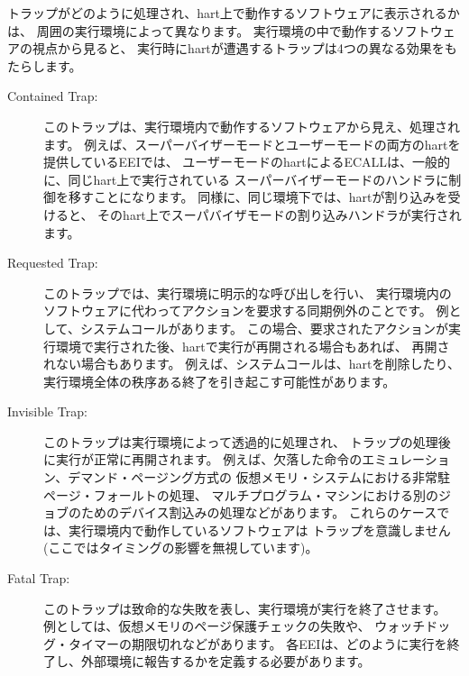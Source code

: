 トラップがどのように処理され、hart上で動作するソフトウェアに表示されるかは、
周囲の実行環境によって異なります。
実行環境の中で動作するソフトウェアの視点から見ると、
実行時にhartが遭遇するトラップは4つの異なる効果をもたらします。

\begin{description}
  \item [Contained Trap:] このトラップは、実行環境内で動作するソフトウェアから見え、処理されます。
  例えば、スーパーバイザーモードとユーザーモードの両方のhartを提供しているEEIでは、
  ユーザーモードのhartによるECALLは、一般的に、同じhart上で実行されている
  スーパーバイザーモードのハンドラに制御を移すことになります。
  同様に、同じ環境下では、hartが割り込みを受けると、
  そのhart上でスーパバイザモードの割り込みハンドラが実行されます。
  \item[Requested Trap:] このトラップでは、実行環境に明示的な呼び出しを行い、
  実行環境内のソフトウェアに代わってアクションを要求する同期例外のことです。
  例として、システムコールがあります。
  この場合、要求されたアクションが実行環境で実行された後、hartで実行が再開される場合もあれば、
  再開されない場合もあります。
  例えば、システムコールは、hartを削除したり、
  実行環境全体の秩序ある終了を引き起こす可能性があります。
  \item[Invisible Trap:] このトラップは実行環境によって透過的に処理され、
  トラップの処理後に実行が正常に再開されます。
  例えば、欠落した命令のエミュレーション、デマンド・ページング方式の
  仮想メモリ・システムにおける非常駐ページ・フォールトの処理、
  マルチプログラム・マシンにおける別のジョブのためのデバイス割込みの処理などがあります。
  これらのケースでは、実行環境内で動作しているソフトウェアは
  トラップを意識しません(ここではタイミングの影響を無視しています)。
  \item[Fatal Trap:] このトラップは致命的な失敗を表し、実行環境が実行を終了させます。
  例としては、仮想メモリのページ保護チェックの失敗や、
  ウォッチドッグ・タイマーの期限切れなどがあります。
  各EEIは、どのように実行を終了し、外部環境に報告するかを定義する必要があります。
\end{description}

\begin{comment}
Table~\ref{table:trapcharacteristics} shows the characteristics of each
kind of trap.

\begin{table}[hbt]
  \centering
  \begin{tabular}{|l|c|c|c|c|}
      \hline
      & Contained & Requested & Invisible & Fatal\\
      \hline
      Execution terminates   & No & No$^{1}$ & No  & Yes \\
      Software is oblivious  & No & No       & Yes & Yes$^{2}$ \\
      Handled by environment & No & Yes      & Yes & Yes \\
      \hline
  \end{tabular}
  \caption{Characteristics of traps. Notes: 1) Termination may be
    requested. 2) Imprecise fatal traps might be observable by software.}
\label{table:trapcharacteristics}
\end{table}
\end{comment}

